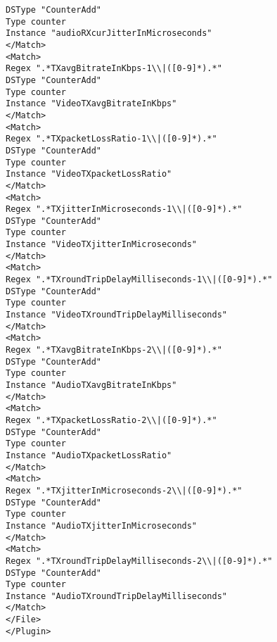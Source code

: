\begin{verbatim}
DSType "CounterAdd"
Type counter
Instance "audioRXcurJitterInMicroseconds"
</Match>
<Match>
Regex ".*TXavgBitrateInKbps-1\\|([0-9]*).*"
DSType "CounterAdd"
Type counter
Instance "VideoTXavgBitrateInKbps"
</Match>
<Match>
Regex ".*TXpacketLossRatio-1\\|([0-9]*).*"
DSType "CounterAdd"
Type counter
Instance "VideoTXpacketLossRatio"
</Match>
<Match>
Regex ".*TXjitterInMicroseconds-1\\|([0-9]*).*"
DSType "CounterAdd"
Type counter
Instance "VideoTXjitterInMicroseconds"
</Match>
<Match>
Regex ".*TXroundTripDelayMilliseconds-1\\|([0-9]*).*"
DSType "CounterAdd"
Type counter
Instance "VideoTXroundTripDelayMilliseconds"
</Match>
<Match>
Regex ".*TXavgBitrateInKbps-2\\|([0-9]*).*"
DSType "CounterAdd"
Type counter
Instance "AudioTXavgBitrateInKbps"
</Match>
<Match>
Regex ".*TXpacketLossRatio-2\\|([0-9]*).*"
DSType "CounterAdd"
Type counter
Instance "AudioTXpacketLossRatio"
</Match>
<Match>
Regex ".*TXjitterInMicroseconds-2\\|([0-9]*).*"
DSType "CounterAdd"
Type counter
Instance "AudioTXjitterInMicroseconds"
</Match>
<Match>
Regex ".*TXroundTripDelayMilliseconds-2\\|([0-9]*).*"
DSType "CounterAdd"
Type counter
Instance "AudioTXroundTripDelayMilliseconds"
</Match>
</File>
</Plugin>
\end{verbatim}
